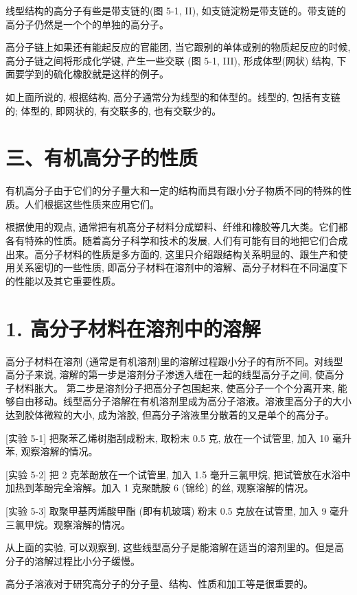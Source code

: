 \documentclass[10pt]{article}
\begin{document}
线型结构的高分子有些是带支链的(图 5-1, II), 如支链淀粉是带支链的。带支链的高分子仍然是一个个的单独的高分子。

高分子链上如果还有能起反应的官能团, 当它跟别的单体或别的物质起反应的时候, 高分子链之间将形成化学键, 产生一些交联 (图 5-1, III), 形成体型(网状) 结构, 下面要学到的硫化橡胶就是这样的例子。

如上面所说的, 根据结构, 高分子通常分为线型的和体型的。线型的, 包括有支链的; 体型的, 即网状的, 有交联多的, 也有交联少的。

\section*{三、有机高分子的性质}

有机高分子由于它们的分子量大和一定的结构而具有跟小分子物质不同的特殊的性质。人们根据这些性质来应用它们。

根据使用的观点, 通常把有机高分子材料分成塑料、纤维和橡胶等几大类。它们都各有特殊的性质。随着高分子科学和技术的发展, 人们有可能有目的地把它们合成出来。高分子材料的性质是多方面的, 这里只介绍跟结构关系明显的、跟生产和使用关系密切的一些性质, 即高分子材料在溶剂中的溶解、高分子材料在不同温度下的性能以及其它重要性质。

\section*{1. 高分子材料在溶剂中的溶解}

高分子材料在溶剂 (通常是有机溶剂)里的溶解过程跟小分子的有所不同。对线型高分子来说, 溶解的第一步是溶剂分子渗透入缠在一起的线型高分子之间, 使高分子材料胀大。 第二步是溶剂分子把高分子包围起来, 使高分子一个个分离开来, 能够自由移动。线型高分子溶解在有机溶剂里成为高分子溶液。溶液里高分子的大小达到胶体微粒的大小, 成为溶胶, 但高分子溶液里分散着的又是单个的高分子。

[实验 5-1] 把聚苯乙烯树脂刮成粉末, 取粉末 0.5 克, 放在一个试管里, 加入 10 毫升苯, 观察溶解的情况。

[实验 5-2] 把 2 克苯酚放在一个试管里, 加入 1.5 毫升三氯甲烷, 把试管放在水浴中加热到苯酚完全溶解。加入 1 克聚酰胺 6 (锦纶) 的丝, 观察溶解的情况。

[实验 5-3] 取聚甲基丙烯酸甲酯 (即有机玻璃) 粉末 0.5 克放在试管里, 加入 9 毫升三氯甲烷。观察溶解的情况。

从上面的实验, 可以观察到, 这些线型高分子是能溶解在适当的溶剂里的。但是高分子的溶解过程比小分子缓慢。

高分子溶液对于研究高分子的分子量、结构、性质和加工等是很重要的。
\end{document}
